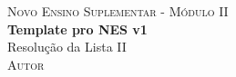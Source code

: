 \thispagestyle{empty}
\begin{center}
    \vspace*{0pt}

    \textsc{\large Novo Ensino Suplementar - Módulo II} \\
    \Huge \textbf{Template pro NES v1} \\

    \vspace{1ex} \Large Resolução da Lista II \\
    \vspace{1.5ex} \textsc{Autor}  %
\end{center}
